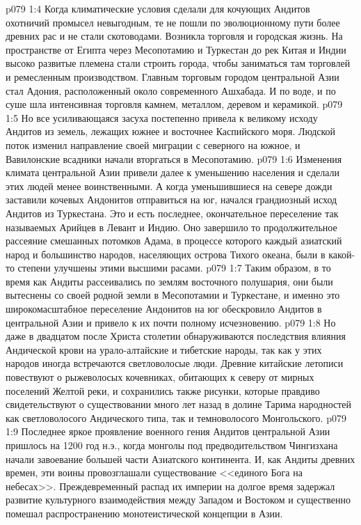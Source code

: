 \vs p079 1:4 Когда климатические условия сделали для кочующих Андитов охотничий промысел невыгодным, те не пошли по эволюционному пути более древних рас и не стали скотоводами. Возникла торговля и городская жизнь. На пространстве от Египта через Месопотамию и Туркестан до рек Китая и Индии высоко развитые племена стали строить города, чтобы заниматься там торговлей и ремесленным производством. Главным торговым городом центральной Азии стал Адония, расположенный около современного Ашхабада. И по воде, и по суше шла интенсивная торговля камнем, металлом, деревом и керамикой.
\vs p079 1:5 Но все усиливающаяся засуха постепенно привела к великому исходу Андитов из земель, лежащих южнее и восточнее Каспийского моря. Людской поток изменил направление своей миграции с северного на южное, и Вавилонские всадники начали вторгаться в Месопотамию.
\vs p079 1:6 Изменения климата центральной Азии привели далее к уменьшению населения и сделали этих людей менее воинственными. А когда уменьшившиеся на севере дожди заставили кочевых Андонитов отправиться на юг, начался грандиозный исход Андитов из Туркестана. Это и есть последнее, окончательное переселение так называемых Арийцев в Левант и Индию. Оно завершило то продолжительное рассеяние смешанных потомков Адама, в процессе которого каждый азиатский народ и большинство народов, населяющих острова Тихого океана, были в какой\hyp{}то степени улучшены этими высшими расами.
\vs p079 1:7 Таким образом, в то время как Андиты рассеивались по землям восточного полушария, они были вытеснены со своей родной земли в Месопотамии и Туркестане, и именно это широкомасштабное переселение Андонитов на юг обескровило Андитов в центральной Азии и привело к их почти полному исчезновению.
\vs p079 1:8 Но даже в двадцатом после Христа столетии обнаруживаются последствия влияния Андической крови на урало\hyp{}алтайские и тибетские народы, так как у этих народов иногда встречаются светловолосые люди. Древние китайские летописи повествуют о рыжеволосых кочевниках, обитающих к северу от мирных поселений Желтой реки, и сохранились также рисунки, которые правдиво свидетельствуют о существовании много лет назад в долине Тарима народностей как светловолосого Андического типа, так и темноволосого Монгольского.
\vs p079 1:9 Последнее яркое проявление военного гения Андитов центральной Азии пришлось на 1200 год н.э., когда монголы под предводительством Чингизхана начали завоевание большей части Азиатского континента. И, как Андиты древних времен, эти воины провозглашали существование <<единого Бога на небесах>>. Преждевременный распад их империи на долгое время задержал развитие культурного взаимодействия между Западом и Востоком и существенно помешал распространению монотеистической концепции в Азии.
